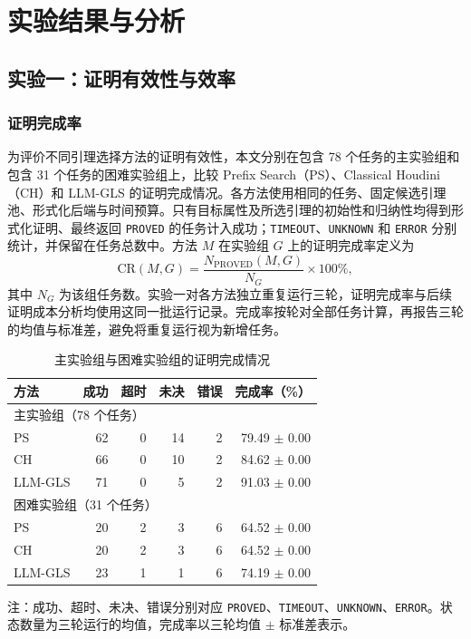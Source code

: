 \section{实验结果与分析}
\mbox{}\par
\subsection{实验一：证明有效性与效率}
\subsubsection{证明完成率}
为评价不同引理选择方法的证明有效性，本文分别在包含 78 个任务的主实验组和包含 31 个任务的困难实验组上，比较 Prefix Search（PS）、Classical Houdini（CH）和 LLM-GLS 的证明完成情况。各方法使用相同的任务、固定候选引理池、形式化后端与时间预算。只有目标属性及所选引理的初始性和归纳性均得到形式化证明、最终返回 \texttt{PROVED} 的任务计入成功；\texttt{TIMEOUT}、\texttt{UNKNOWN} 和 \texttt{ERROR} 分别统计，并保留在任务总数中。方法 $M$ 在实验组 $G$ 上的证明完成率定义为
\[
  \mathrm{CR}(M,G)=
  \frac{N_{\mathrm{PROVED}}(M,G)}{N_G}\times 100\%,
\]
其中 $N_G$ 为该组任务数。实验一对各方法独立重复运行三轮，证明完成率与后续证明成本分析均使用这同一批运行记录。完成率按轮对全部任务计算，再报告三轮的均值与标准差，避免将重复运行视为新增任务。

\begin{table}[t]
  \centering
  \caption{主实验组与困难实验组的证明完成情况}
  \label{tab:proof_completion_rate}
  \small
  \setlength{\tabcolsep}{4pt}
  \begin{tabular}{lrrrrr}
    \hline
    方法 & 成功 & 超时 & 未决 & 错误 & 完成率（\%） \\
    \hline
    \multicolumn{6}{l}{主实验组（78 个任务）} \\
    PS      & 62 & 0 & 14 & 2 & 79.49 $\pm$ 0.00 \\
    CH      & 66 & 0 & 10 & 2 & 84.62 $\pm$ 0.00 \\
    LLM-GLS & 71 & 0 & 5  & 2 & 91.03 $\pm$ 0.00 \\
    \hline
    \multicolumn{6}{l}{困难实验组（31 个任务）} \\
    PS      & 20 & 2 & 3 & 6 & 64.52 $\pm$ 0.00 \\
    CH      & 20 & 2 & 3 & 6 & 64.52 $\pm$ 0.00 \\
    LLM-GLS & 23 & 1 & 1 & 6 & 74.19 $\pm$ 0.00 \\
    \hline
  \end{tabular}
  \par\smallskip
  \begin{minipage}{\columnwidth}
    \footnotesize
    注：成功、超时、未决、错误分别对应 \texttt{PROVED}、\texttt{TIMEOUT}、\texttt{UNKNOWN}、\texttt{ERROR}。状态数量为三轮运行的均值，完成率以三轮均值 $\pm$ 标准差表示。
  \end{minipage}
\end{table}

